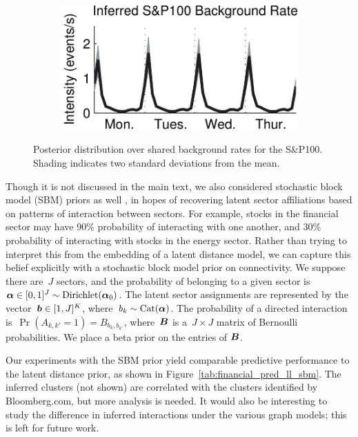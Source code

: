 \begin{figure}[!h]
  \begin{subfigure}[T]{\linewidth}
    \begin{center}
      \includegraphics[width=.6\linewidth]{figures/ch2/financial_bkgd}
    \end{center}
  \end{subfigure}
  \caption[Time-varying S\&P 100 background rates]{Posterior
    distribution over shared background rates for the S\&P100. Shading
    indicates two standard deviations from the mean.}
  \label{fig:financial_bkgd}
\end{figure}

Though it is not discussed in the main text, we also considered
stochastic block model (SBM) priors as well \cite{Hoff-2008}, in hopes
of recovering latent sector affiliations based on patterns of
interaction between sectors. For example, stocks in the financial
sector may have 90\% probability of interacting with one another, and
30\% probability of interacting with stocks in the energy
sector. Rather than trying to interpret this from the embedding of a
latent distance model, we can capture this belief explicitly with a
stochastic block model prior on connectivity. We suppose there are~$J$
sectors, and the probability of belonging to a given sector
is~${\boldsymbol{\alpha} \in [0,1]^J\sim\text{Dirichlet}(\boldsymbol{\alpha}_0)}$. The latent
sector assignments are represented by the vector~${\boldsymbol{b}\in [1,J]^K}$,
where~${b_k\sim\text{Cat}(\boldsymbol{\alpha})}$. The probability of a directed
interaction is~${\Pr(A_{k,k'}=1)=B_{b_{k},b_{k'}}}$, where~$\boldsymbol{B}$ is
a~${J\times J}$ matrix of Bernoulli probabilities. We place a beta
prior on the entries of $\boldsymbol{B}$.

Our experiments with the SBM prior yield comparable predictive
performance to the latent distance prior, as shown in
Figure~\ref{tab:financial_pred_ll_sbm}. The inferred clusters (not
shown) are correlated with the clusters identified by Bloomberg.com,
but more analysis is needed. It would also be interesting to study the
difference in inferred interactions under the various graph models;
this is left for future work.

